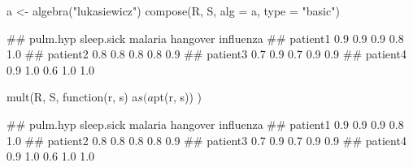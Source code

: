 \documentclass{article}\usepackage[]{graphicx}\usepackage[]{color}
\begin{document}
\begin{Schunk}
% --begin: "comp.basic"
\begin{Sinput}
a <- algebra("lukasiewicz")
compose(R, S, alg = a, type = "basic")
\end{Sinput}
\begin{Soutput}
##          pulm.hyp sleep.sick malaria hangover influenza
## patient1      0.9        0.9     0.9      0.8       1.0
## patient2      0.8        0.8     0.8      0.8       0.9
## patient3      0.7        0.9     0.7      0.9       0.9
## patient4      0.9        1.0     0.6      1.0       1.0
\end{Soutput}
%
% --end: "comp.basic"
\end{Schunk}

\begin{Schunk}
% --begin: "comp.mult"
\begin{Sinput}
mult(R, S, function(r, s) {
    a$s(a$pt(r, s))
})
\end{Sinput}
\begin{Soutput}
##          pulm.hyp sleep.sick malaria hangover influenza
## patient1      0.9        0.9     0.9      0.8       1.0
## patient2      0.8        0.8     0.8      0.8       0.9
## patient3      0.7        0.9     0.7      0.9       0.9
## patient4      0.9        1.0     0.6      1.0       1.0
\end{Soutput}
%
% --end: "comp.mult"
\end{Schunk}
\end{document}
